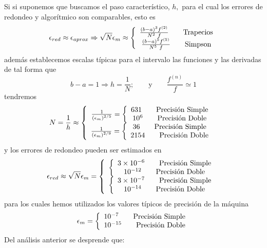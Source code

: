 \documentclass[spanish,titlepage,11pt]{article}
\begin{document}
Si si suponemos que buscamos el paso caracter\'{i}stico, $h,$ para el cual los
errores de redondeo y algor\'{i}tmico son comparables, esto es
\begin{equation}
\epsilon_{red}\approx\epsilon_{aprox}\Rightarrow\sqrt{N}\epsilon_{m}%
\approx\left\{
\begin{array}
[c]{c}%
\frac{\left(  b-a\right)  ^{3}f^{\left(  2\right)  }}{N^{2\ }f}\qquad
\text{Trapecios}\\
\frac{\left(  b-a\right)  ^{5}f^{\left(  5\right)  }}{N^{5}\ f}\qquad
\text{Simpson}%
\end{array}
\right.
\end{equation}
adem\'{a}s establecemos escalas t\'{i}picas para el intervalo las funciones y
las derivadas de tal forma que
\begin{equation}
b-a=1\Longrightarrow h=\frac{1}{N};\qquad\text{y}\qquad\frac{f^{\left(
n\right)  }}{f}\simeq1
\end{equation}
tendremos
\begin{equation}
N=\frac{1}{h}\approx\left\{
\begin{array}
[c]{c}%
\frac{1}{\left(  \epsilon_{m}\right)  ^{2/5}}=\left\{
\begin{array}
[c]{c}%
631\qquad\text{Precisi\'{o}n Simple}\\
10^{6}\qquad\text{Precisi\'{o}n Doble}%
\end{array}
\right. \\
\frac{1}{\left(  \epsilon_{m}\right)  ^{2/9}}=\left\{
\begin{array}
[c]{c}%
36\qquad\text{Precisi\'{o}n Simple}\\
2154\qquad\text{Precisi\'{o}n Doble}%
\end{array}
\right.
\end{array}
\right.
\end{equation}
y los errores de redondeo pueden ser estimados en
\begin{equation}
\epsilon_{red}\approx\sqrt{N}\epsilon_{m}=\left\{
\begin{array}
[c]{c}%
\left\{
\begin{array}
[c]{c}%
3\times10^{-6}\qquad\text{Precisi\'{o}n Simple}\\
10^{-12}\qquad\text{Precisi\'{o}n Doble}%
\end{array}
\right. \\
\left\{
\begin{array}
[c]{c}%
3\times10^{-7}\qquad\text{Precisi\'{o}n Simple}\\
10^{-14}\qquad\text{Precisi\'{o}n Doble}%
\end{array}
\right.
\end{array}
\right.
\end{equation}
para los cuales hemos utilizados los valores t\'{i}picos de precisi\'{o}n de
la m\'{a}quina
\begin{equation}
\epsilon_{m}=\left\{
\begin{array}
[c]{c}%
10^{-7}\qquad\text{Precisi\'{o}n Simple}\\
10^{-15}\qquad\text{Precisi\'{o}n Doble}%
\end{array}
\right.
\end{equation}
Del an\'{a}lisis anterior se desprende que:
\end{document}
